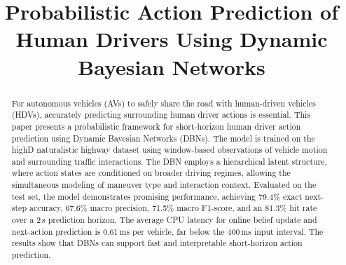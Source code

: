 \documentclass[upint,subscriptcorrection,varvw,hyphenate,balance,greek,russian,vietnamese,german]{asmeconf} %
\begin{document}


\title{Probabilistic Action Prediction of Human Drivers Using Dynamic Bayesian Networks} 
 


\maketitle




\begin{abstract}
For autonomous vehicles (AVs) to safely share the road with human-driven vehicles (HDVs), accurately predicting surrounding human driver actions is essential.     
This paper presents a probabilistic framework for short-horizon human driver action prediction using Dynamic Bayesian Networks (DBNs). 
The model is trained on the highD naturalistic highway dataset using window-based observations of vehicle motion and surrounding traffic interactions. 
The DBN employs a hierarchical latent structure, where action states are conditioned on broader driving regimes, allowing the simultaneous modeling of maneuver type and interaction context.
Evaluated on the test set, the model demonstrates promising performance, achieving 79.4\% exact next-step accuracy, 67.6\% macro precision, 71.5\% macro F1-score, and an 81.3\% hit rate over a 2\,s prediction horizon. 
The average CPU latency for online belief update and next-action prediction is 0.61\,ms per vehicle, far below the 400\,ms input interval.  
The results show that DBNs can support fast and interpretable short-horizon action prediction. 
\end{abstract}


\end{document}
